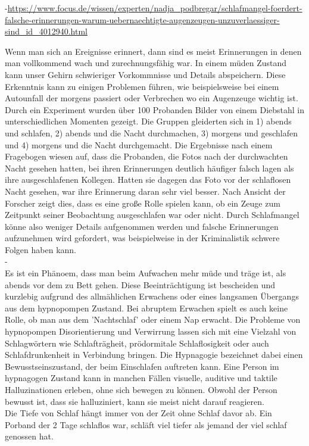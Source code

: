 -\url{https://www.focus.de/wissen/experten/nadja_podbregar/schlafmangel-foerdert-falsche-erinnerungen-warum-uebernaechtigte-augenzeugen-unzuverlaessiger-sind_id_4012940.html}

Wenn man sich an Ereignisse erinnert, dann sind es meist Erinnerungen in denen man vollkommend wach und zurechnungsfähig war. In einem müden Zustand kann unser Gehirn schwieriger Vorkommnisse und Details abspeichern. Diese Erkenntnis kann zu einigen Problemen führen, wie beispielsweise bei einem Autounfall der morgens passiert oder Verbrechen wo ein Augenzeuge wichtig ist. Durch ein Experiment wurden über 100 Probanden Bilder von einem Diebstahl in unterschiedlichen Momenten gezeigt. Die Gruppen gleiderten sich in 1) abends und schlafen, 2) abends und die Nacht durchmachen, 3) morgens und geschlafen und 4) morgens und die Nacht durchgemacht. Die Ergebnisse nach einem Fragebogen wiesen auf, dass die Probanden, die Fotos nach der durchwachten Nacht gesehen hatten, bei ihren Erinnerungen deutlich häufiger falsch lagen als ihre ausgeschlafenen Kollegen. Hatten sie dagegen das Foto vor der schlaflosen Nacht gesehen, war ihre Erinnerung daran sehr viel besser. Nach Ansicht der Forscher zeigt dies, dass es eine große Rolle spielen kann, ob ein Zeuge zum Zeitpunkt seiner Beobachtung ausgeschlafen war oder nicht. Durch Schlafmangel könne also weniger Details aufgenommen werden und falsche Erinnerungen aufzunehmen wird gefordert, was beispielweise in der Kriminalistik schwere Folgen haben kann.\\


-\cite{dinges1990you}\\
Es ist ein Phänoem, dass man beim Aufwachen mehr müde und träge ist, als abends vor dem zu Bett gehen. Diese Beeinträchtigung ist bescheiden und kurzlebig aufgrund des allmählichen Erwachens oder eines langsamen Übergangs aus dem hypnopompen Zustand. Bei abruptem Erwachen spielt es auch keine Rolle, ob man aus dem 'Nachtschlaf' oder einem Nap erwacht. Die Probleme von hypnopompen Disorientierung und Verwirrung lassen sich mit eine Vielzahl von Schlagwörtern wie Schlafträgheit, prödormitale Schlaflosigkeit oder auch Schlafdrunkenheit in Verbindung bringen. Die Hypnagogie bezeichnet dabei einen Bewusstseinszustand, der beim Einschlafen auftreten kann. Eine Person im hypnagogen Zustand kann in manchen Fällen visuelle, auditive und taktile Halluzinationen erleben, ohne sich bewegen zu können. Obwohl der Person bewusst ist, dass sie halluziniert, kann sie meist nicht darauf reagieren.\\
Die Tiefe von Schlaf hängt immer von der Zeit ohne Schlaf davor ab. Ein Porband der 2 Tage schlaflos war, schläft viel tiefer als jemand der viel schlaf genossen hat.%